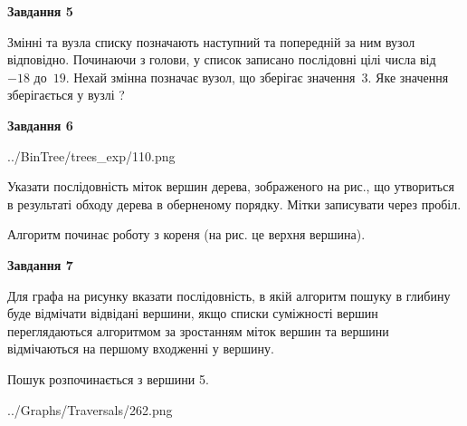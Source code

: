 \documentclass[12pt, ukrainian]{article}
\begin{document}
{\begin {large}
{\begin {center}\textbf{Завдання 5}\end {center}}\par
Змінні  та  вузла списку позначають наступний та попередній за ним вузол відповідно. Починаючи з голови, у список записано послідовні цілі числа від~$-18$ до~$19$. Нехай змінна  позначає вузол, що зберігає значення~$3$.
Яке значення зберігається у вузлі  ?\par
\newpage

{\begin {center}\textbf{Завдання 6}\end {center}}\par

\begin{center}
	{../BinTree/trees_exp/110.png}
\end{center}
Указати послідовність міток вершин дерева, зображеного на рис., що утвориться в результаті обходу дерева в оберненому порядку. Мітки записувати через пробіл.\par Алгоритм починає роботу з кореня (на рис. це верхня вершина).\par
\newpage

{\begin {center}\textbf{Завдання 7}\end {center}}\par
Для графа на рисунку вказати послідовність, в якій алгоритм пошуку в глибину буде відмічати відвідані вершини, якщо списки суміжності вершин переглядаються алгоритмом за зростанням міток вершин та вершини відмічаються на першому вход\-женні у вершину.\par
Пошук розпочинається з вершини 5.\par

\begin{center}
	{../Graphs/Traversals/262.png}
\end{center}\par
\newpage


\end{large}}
\end{document}
